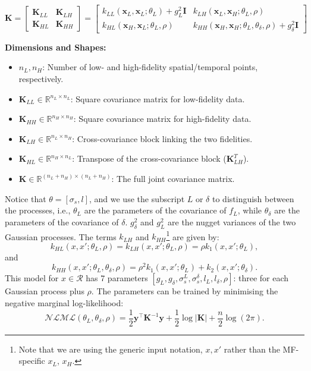 \documentclass[12pt]{article}
\begin{document}
\begin{equation}
\bm{K} = \begin{bmatrix}
\bm{K}_{LL} & \bm{K}_{LH} \\
\bm{K}_{HL} & \bm{K}_{HH}
\end{bmatrix} = 
\begin{bmatrix}
k_{LL}(\bm{x}_L, \bm{x}_L; \theta_L) + g_L^2 \bm{I} & k_{LH}(\bm{x}_L, \bm{x}_H; \theta_L, \rho)\\
k_{HL}(\bm{x}_H, \bm{x}_L; \theta_L, \rho) & k_{HH}(\bm{x}_H, \bm{x}_H; \theta_L, \theta_{\delta}, \rho) + g_{\delta}^2 \bm{I}
\end{bmatrix}
\end{equation}

\noindent \textbf{Dimensions and Shapes:}
\begin{itemize}
    \item $n_L, n_H$: Number of low- and high-fidelity spatial/temporal points, respectively.
    \item $\bm{K}_{LL} \in \mathbb{R}^{n_L \times n_L}$: Square covariance matrix for low-fidelity data.
    \item $\bm{K}_{HH} \in \mathbb{R}^{n_H \times n_H}$: Square covariance matrix for high-fidelity data.
    \item $\bm{K}_{LH} \in \mathbb{R}^{n_L \times n_H}$: Cross-covariance block linking the two fidelities.
    \item $\bm{K}_{HL} \in \mathbb{R}^{n_H \times n_L}$: Transpose of the cross-covariance block ($\bm{K}_{LH}^T$).
    \item $\bm{K} \in \mathbb{R}^{(n_L+n_H) \times (n_L+n_H)}$: The full joint covariance matrix.
\end{itemize}
\noindent %
\hangindent=-5mm
Notice that $\theta=[\sigma_s,l]$, and we use the subscript $L$ or $\delta$ to distinguish between the processes, i.e., $\theta_L$ are the parameters of the covariance of $f_L$, while $\theta_{\delta}$ are the parameters of the covariance of $\delta$. $g_\delta^2$ and $g_L^2$ are the nugget variances of the two Gaussian processes. The terms $k_{LH}$ and $k_{HH}$\footnote{Note that we are using the generic input notation, $x,x'$ rather than the MF-specific $x_L$, $x_H$.} are given by: 
\[
    k_{HL}(x, x'; \theta_L, \rho) = k_{LH}(x, x'; \theta_L, \rho) = \rho k_1(x, x'; \theta_L),
\]
and 
\[
    k_{HH}(x, x'; \theta_L, \theta_{\delta}, \rho) = \rho^2 k_1(x, x'; \theta_L) + k_2(x, x'; \theta_{\delta}).
\]
\noindent
\hangindent=-5mm
This model for $x \in \mathcal{R}$ has 7 parameters $[g_L, g_{\delta}, \sigma^L_s,\sigma^{\delta}_s,l_L,l_{\delta}, \rho]$: three for each Gaussian process plus $\rho$. The parameters can be trained by minimising the negative marginal log-likelihood:
\begin{equation}
    \mathcal{NLML}(\theta_L, \theta_{\delta}, \rho) = \frac12 \bm{y}^\top \bm{K}^{-1} \bm{y} + \frac12 \log |\bm{K}| + \frac{n}{2} \log(2 \pi).
\end{equation}
\end{document}
